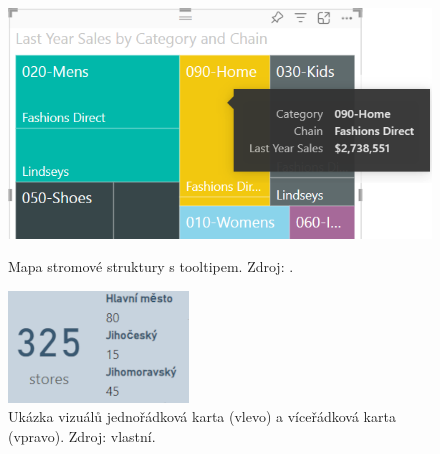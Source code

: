 \begin{figure}[hbtp!]
    \centering
    \begin{minipage}{.4\textwidth}
        \centering
        \captionsetup{justification=centering}
        \includegraphics[width=\textwidth]{obrazky/PBIteorie/power-bi-treemap-category-tooltip.png}
        \caption{Mapa stromové struktury s tooltipem. Zdroj: \cite{bib:PBI}.}
        \label{obr:PBImapa}
    \end{minipage}%
    \hspace*{0.4em}
    \begin{minipage}{.2\textwidth}
        \centering
        \captionsetup{justification=centering}
        \includegraphics[width=\textwidth]{obrazky/PBIteorie/kartastoresSFF.png}
        \caption{Ukázka vizuálů jednořádková karta (vlevo) a víceřádková karta (vpravo). Zdroj: vlastní.}
        \label{obr:PBIkarty}
    \end{minipage}%
    \hspace*{0.4em}
    \begin{minipage}{.4\textwidth}
        \centering
        \captionsetup{justification=centering}

\end{minipage}
\end{figure}
